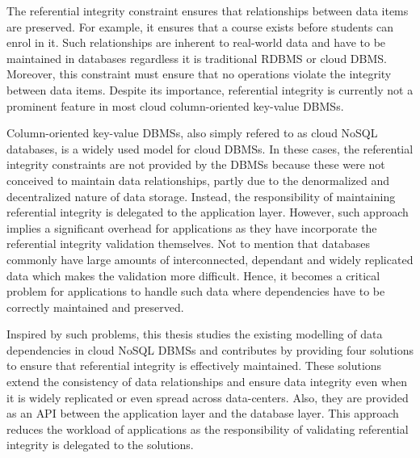    The referential integrity constraint  ensures that  relationships
   between data items are preserved. For example, it ensures that a course
   exists before students can enrol in it. Such relationships are 
   inherent to real-world data and have to be maintained in databases
   regardless it is traditional \ac{RDBMS} or cloud \ac{DBMS}.
   Moreover, this constraint must ensure that no operations violate  the
   integrity between  data items.   Despite its importance, referential
   integrity is currently not a prominent feature in most  cloud
   column-oriented key-value \acp{DBMS}. 
   
   
   Column-oriented key-value \acp{DBMS}, also simply refered to as cloud
   \ac{NoSQL} databases, is a widely used model for cloud \acp{DBMS}. In
   these cases, the referential integrity constraints are not provided
   by the \acp{DBMS} because these were not conceived to maintain data
   relationships, partly due to the denormalized and decentralized nature of
   data storage.  Instead, the responsibility of maintaining
   referential integrity is delegated to the application layer.
    However, such approach implies a significant overhead for applications as
    they have incorporate the referential integrity validation themselves. Not
    to mention that databases commonly have large amounts of interconnected,
    dependant and widely replicated data which makes the validation more
    difficult. Hence, it becomes a  critical problem for applications to handle
   such  data where dependencies have to be correctly maintained and preserved.
   
   
	Inspired by such problems, this thesis studies the existing
modelling of data dependencies in cloud \ac{NoSQL}  \acp{DBMS}  and contributes by
providing four solutions to ensure  that referential integrity is
effectively maintained. These solutions  extend the consistency of data
relationships and  ensure  data integrity even when it is widely replicated or
even spread across data-centers. Also, they are provided as an \ac{API} between
the application layer and the database layer. This approach reduces the
workload of applications as the responsibility
of validating referential integrity is delegated to the solutions.

   
   

    
 
   
    
%     
%     
%     
%     
%     
%     
%    
%      
%    
%  
   

